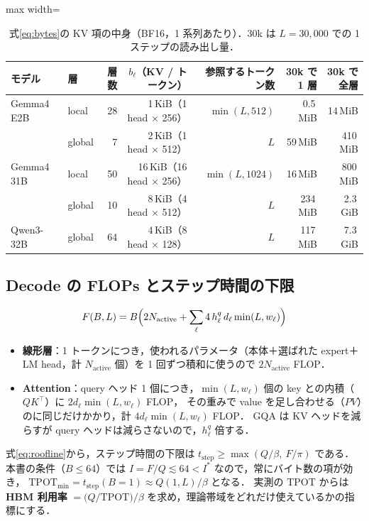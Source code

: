 \documentclass[a4paper,10pt]{ltjsarticle}
\begin{document}
\begin{table}[htbp]\centering\small
\caption{式\eqref{eq:bytes}の KV 項の中身（BF16，1 系列あたり）．30k は $L=30{,}000$ での 1 ステップの読み出し量．}
\label{tab:kvterm}
\begin{adjustbox}{max width=\linewidth}
\begin{tabular}{llrrrrr}\toprule
モデル & 層 & 層数 & $b_\ell$（KV / トークン） & 参照するトークン数 & 30k で 1 層 & 30k で全層 \\\midrule
Gemma4 E2B & local & 28 & 1\,KiB（1 head $\times$ 256） & $\min(L, 512)$ & 0.5\,MiB & 14\,MiB \\
           & global & 7 & 2\,KiB（1 head $\times$ 512） & $L$ & 59\,MiB & 410\,MiB \\
Gemma4 31B & local & 50 & 16\,KiB（16 head $\times$ 256） & $\min(L, 1024)$ & 16\,MiB & 800\,MiB \\
           & global & 10 & 8\,KiB（4 head $\times$ 512） & $L$ & 234\,MiB & 2.3\,GiB \\\midrule
Qwen3-32B  & global & 64 & 4\,KiB（8 head $\times$ 128） & $L$ & 117\,MiB & 7.3\,GiB \\
\bottomrule\end{tabular}
\end{adjustbox}
\end{table}

\subsection{Decode の FLOPs とステップ時間の下限}
\begin{equation}
F(B,L) = B\Bigl(2N_\text{active} + \sum_\ell 4\, h^{q}_\ell\, d_\ell \min(L,w_\ell)\Bigr)
\label{eq:flops}
\end{equation}
\begin{itemize}
\item \textbf{線形層}：1 トークンにつき，使われるパラメータ（本体＋選ばれた expert＋LM head，計 $N_\text{active}$ 個）を 1 回ずつ積和に使うので $2N_\text{active}$ FLOP．
\item \textbf{Attention}：query ヘッド 1 個につき，$\min(L,w_\ell)$ 個の key との内積（$QK^\top$）に $2d_\ell \min(L,w_\ell)$ FLOP，
      その重みで value を足し合わせる（$PV$）のに同じだけかかり，計 $4d_\ell \min(L,w_\ell)$ FLOP．
      GQA は KV ヘッドを減らすが query ヘッドは減らさないので，$h^q_\ell$ 倍する．
\end{itemize}
式\eqref{eq:roofline}から，ステップ時間の下限は $t_\text{step} \ge \max(Q/\beta,\ F/\pi)$ である．
本書の条件（$B \le 64$）では $I = F/Q \lesssim 64 < I^\ast$ なので，常にバイト数の項が効き，
$\text{TPOT}_\text{min} = t_\text{step}(B{=}1) \approx Q(1,L)/\beta$ となる．
実測の TPOT からは \textbf{HBM 利用率} $= \bigl(Q/\text{TPOT}\bigr)/\beta$ を求め，理論帯域をどれだけ使えているかの指標にする．
\end{document}
